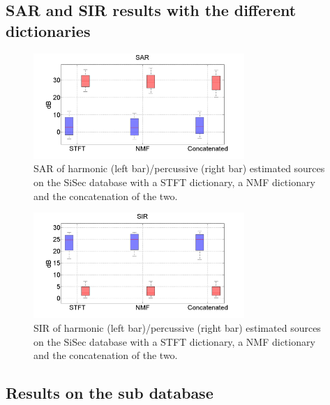 \documentclass[journal]{IEEEtran}
\begin{document}
\subsection{SAR and SIR results with the different dictionaries}

\begin{figure}[htb]

  \centering 
  \includegraphics[width=8cm]{fig/DictSAR.png}
  \caption{\label{resultsDictSAR} SAR of harmonic (left bar)/percussive (right bar) estimated sources on the SiSec database with a STFT dictionary, a NMF dictionary and the concatenation of the two.}
  
\end{figure}
\begin{figure}[htb]

  \centering 
  \includegraphics[width=8cm]{fig/DictSIR.png}
  \caption{\label{resultsDictSIR} SIR of harmonic (left bar)/percussive (right bar) estimated sources on the SiSec database with a STFT dictionary, a NMF dictionary and the concatenation of the two.}
  
\end{figure}

\subsection{Results on the sub database}
\end{document}
